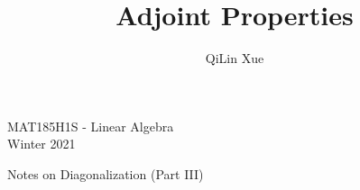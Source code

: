 \documentclass{article}
\title{Adjoint Properties}
\author{QiLin Xue}
\begin{document}
\begin{center}
    MAT185H1S - Linear Algebra \\ 
    Winter 2021
\end{center}
Notes on Diagonalization (Part III)
\end{document}
